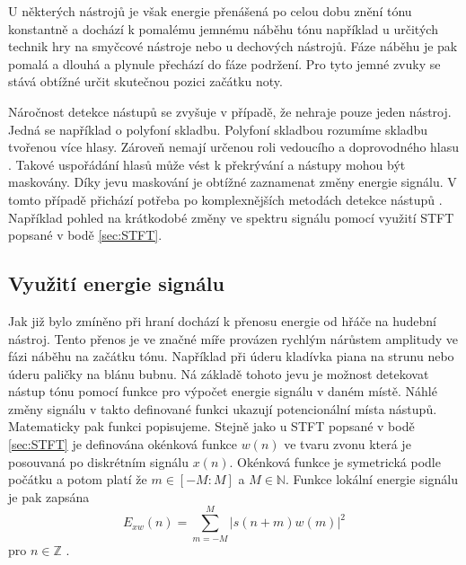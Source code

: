 U některých nástrojů je však energie přenášená po celou dobu znění tónu konstantně a dochází k pomalému jemnému náběhu tónu například u určitých technik hry na smyčcové nástroje nebo u dechových nástrojů. Fáze náběhu je pak pomalá a dlouhá a plynule přechází do fáze podržení. Pro tyto jemné zvuky se stává obtížné určit skutečnou pozici začátku noty.



Náročnost detekce nástupů se zvyšuje v případě, že nehraje pouze jeden nástroj. Jedná se například o polyfoní skladbu. Polyfoní skladbou rozumíme skladbu tvořenou více hlasy.
Zároveň nemají určenou roli vedoucího a doprovodného hlasu \cite{6155601}.
Takové uspořádání hlasů může vést k překrývání a nástupy mohou být maskovány. Díky jevu maskování je obtížné zaznamenat změny energie signálu. V tomto případě přichází potřeba po komplexnějších metodách detekce nástupů \cite{fundamental_of_music_processing}. Například pohled na krátkodobé změny ve spektru signálu pomocí využití \acs{STFT} popsané v bodě \ref{sec:STFT}.

  \subsection{Využití energie signálu} \label{sec:Energie_signalu}

  Jak již bylo zmíněno při hraní dochází k přenosu energie od hřáče na hudební nástroj.
  Tento přenos je ve značné míře provázen rychlým nárůstem amplitudy ve fázi náběhu na začátku tónu.
  Například při úderu kladívka piana na strunu nebo úderu paličky na blánu bubnu.
  Ná základě tohoto jevu je možnost detekovat nástup tónu pomocí funkce pro výpočet energie signálu v daném místě.
  Náhlé změny signálu v takto definované funkci ukazují potencionální místa nástupů.
  Matematicky pak funkci popisujeme. 
  Stejně jako u \acs{STFT} popsané v bodě \ref{sec:STFT} je definována okénková funkce $w(n)$ ve tvaru zvonu  která je posouvaná po diskrétním signálu $x(n)$.
  Okénková funkce je symetrická podle počátku a potom platí že $ m \in [-M : M]$ a $M \in \mathbb{N}$. Funkce lokální energie signálu je pak zapsána
  \begin{equation}
    E_{xw}(n) = \sum_{m = -M}^{M} |s(n+m)w(m)|^2
  \end{equation}
  pro $n \in \mathbb{Z}$ \cite{fundamental_of_music_processing}.

